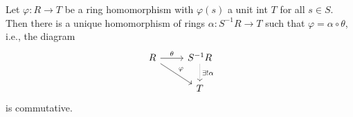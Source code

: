 Let $\varphi\colon R\to T$ be a ring homomorphism with $\varphi(s)$ a unit int $T$
for all $s \in S$. Then there is a unique homomorphism of rings
$\alpha\colon S^{-1}R\to T$ such that $\varphi = \alpha\circ\theta$, i.e., the
diagram
\[\begin{tikzcd}
	R\ar[r, "\theta"]\ar[dr, "\varphi"] & S^{-1}R\ar[d, densely dotted, "\exists! \alpha"]\\
	& T
\end{tikzcd}\]
is commutative.
